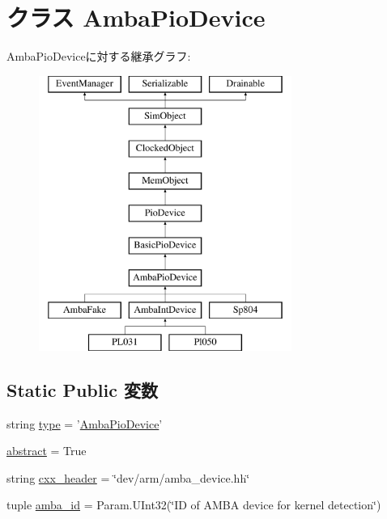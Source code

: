 \hypertarget{classRealView_1_1AmbaPioDevice}{
\section{クラス AmbaPioDevice}
\label{classRealView_1_1AmbaPioDevice}
}
AmbaPioDeviceに対する継承グラフ:\begin{figure}[H]
\begin{center}
\leavevmode
\includegraphics[height=9cm]{classRealView_1_1AmbaPioDevice}
\end{center}
\end{figure}
\subsection*{Static Public 変数}
\begin{DoxyCompactItemize}
\item 
string \hyperlink{classRealView_1_1AmbaPioDevice_acce15679d830831b0bbe8ebc2a60b2ca}{type} = '\hyperlink{classRealView_1_1AmbaPioDevice}{AmbaPioDevice}'
\item 
\hyperlink{classRealView_1_1AmbaPioDevice_a17fa61ac3806b481cafee5593b55e5d0}{abstract} = True
\item 
string \hyperlink{classRealView_1_1AmbaPioDevice_a17da7064bc5c518791f0c891eff05fda}{cxx\_\-header} = \char`\"{}dev/arm/amba\_\-device.hh\char`\"{}
\item 
tuple \hyperlink{classRealView_1_1AmbaPioDevice_ad9d2b9e37de5c1c7c10219fc1b834599}{amba\_\-id} = Param.UInt32(\char`\"{}ID of AMBA device for kernel detection\char`\"{})
\end{DoxyCompactItemize}


